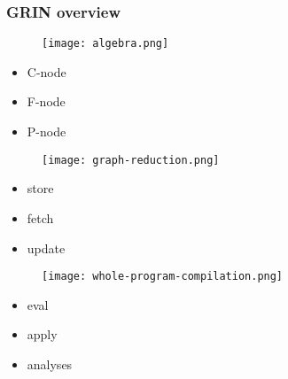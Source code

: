 \documentclass[bigger]{beamer}
\begin{document}
\begin{frame}[fragile]
\frametitle{GRIN overview}
\begin{center}

	\begin{minipage}{0.30\textwidth}
		\vspace{1cm}
		\begin{figure}
			\texttt{[image: algebra.png]}
		\end{figure}
		\vspace{0.3cm}
		\begin{itemize}
			\item C-node
			\item F-node
			\item P-node
		\end{itemize}
	\end{minipage}
	\hfill
	\begin{minipage}{0.30\textwidth}
		\begin{figure}
			\texttt{[image: graph-reduction.png]}
		\end{figure}
		\begin{itemize}
			\item store
			\item fetch
			\item update
		\end{itemize}
	\end{minipage}
	\hfill
	\begin{minipage}{0.30\textwidth}
		\begin{figure}
			\texttt{[image: whole-program-compilation.png]}
		\end{figure}
		\begin{itemize}
			\item eval
			\item apply
			\item analyses
		\end{itemize}
	\end{minipage}

\end{center}
\end{frame}


\end{document}
